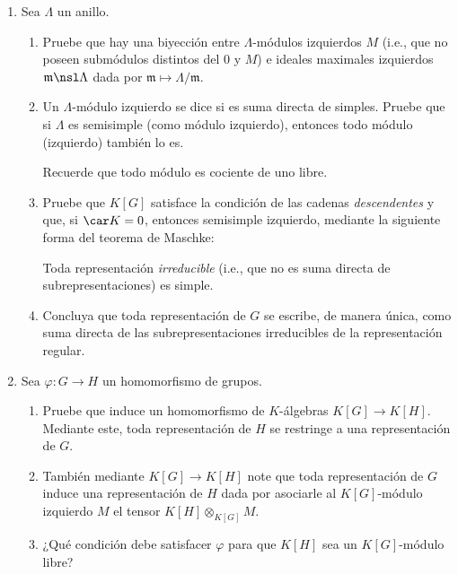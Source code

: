 \documentclass[11pt, reqno]{amsart}
\begin{document}
\begin{enumerate}
	\item Sea $\Lambda$ un anillo.
		\begin{enumerate}
			\item Pruebe que hay una biyección entre $\Lambda$-módulos izquierdos $M$  (i.e.,
				que no poseen submódulos distintos del 0 y $M$) e ideales maximales izquierdos
				$\mathfrak{m} \nsl \Lambda$ dada por $\mathfrak{m} \mapsto \Lambda/\mathfrak{m}$.

			\item Un $\Lambda$-módulo izquierdo se dice  si es suma directa de simples.
				Pruebe que si $\Lambda$ es semisimple (como módulo izquierdo), entonces todo módulo
				(izquierdo) también lo es.

				\begin{hint}
					Recuerde que todo módulo es cociente de uno libre.
				\end{hint}

			\item Pruebe que $K[G]$ satisface la condición de las cadenas \emph{descendentes} y que, si
				$\car K = 0$, entonces semisimple izquierdo, mediante la siguiente forma del teorema de
				Maschke:

				\begin{thm}[Maschke]
					Toda representación \emph{irreducible} (i.e., que no es suma directa de
					subrepresentaciones) es simple.
				\end{thm}

			\item\lookright
				Concluya que toda representación de $G$ se escribe, de manera única, como suma directa de
				las subrepresentaciones irreducibles de la representación regular.
		\end{enumerate}

	\item Sea $\varphi \colon G \to H$ un homomorfismo de grupos.
		\begin{enumerate}
			\item Pruebe que induce un homomorfismo de $K$-álgebras $K[G] \to K[H]$.
				Mediante este, toda representación de $H$ se restringe a una representación de $G$.

			\item También mediante $K[G] \to K[H]$ note que toda representación de $G$ induce una
				representación de $H$ dada por asociarle al $K[G]$-módulo izquierdo $M$ el tensor $K[H]
				\otimes_{K[G]} M$.

			\item ¿Qué condición debe satisfacer $\varphi$ para que $K[H]$ sea un $K[G]$-módulo libre?
		\end{enumerate}


\end{enumerate}
\end{document}
